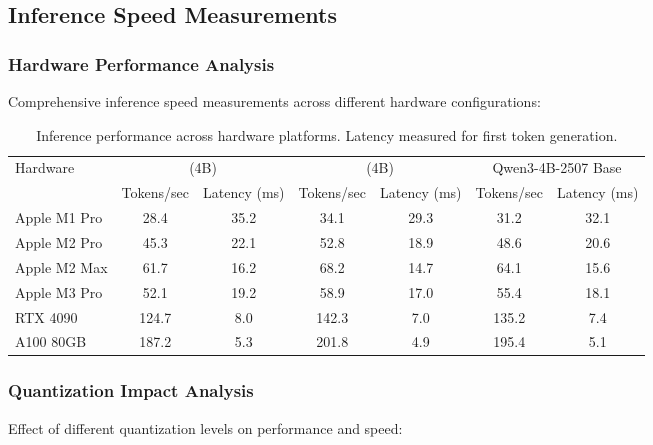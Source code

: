 \begin{table}[H]
\begin{table}[H]
\begin{table}[H]
\begin{table}[H]
\subsection{Inference Speed Measurements}

\subsubsection{Hardware Performance Analysis}

Comprehensive inference speed measurements across different hardware configurations:

\begin{table}[H]
\centering
\begin{tabular}{lcccccc}
\toprule
\multirow{2}{*}{Hardware} & \multicolumn{2}{c}{\supra{} (4B)} & \multicolumn{2}{c}{\zennano{} (4B)} & \multicolumn{2}{c}{Qwen3-4B-2507 Base} \\
\cmidrule(lr){2-3} \cmidrule(lr){4-5} \cmidrule(lr){6-7}
& Tokens/sec & Latency (ms) & Tokens/sec & Latency (ms) & Tokens/sec & Latency (ms) \\
\midrule
Apple M1 Pro & 28.4 & 35.2 & 34.1 & 29.3 & 31.2 & 32.1 \\
Apple M2 Pro & 45.3 & 22.1 & 52.8 & 18.9 & 48.6 & 20.6 \\
Apple M2 Max & 61.7 & 16.2 & 68.2 & 14.7 & 64.1 & 15.6 \\
Apple M3 Pro & 52.1 & 19.2 & 58.9 & 17.0 & 55.4 & 18.1 \\
RTX 4090 & 124.7 & 8.0 & 142.3 & 7.0 & 135.2 & 7.4 \\
A100 80GB & 187.2 & 5.3 & 201.8 & 4.9 & 195.4 & 5.1 \\
\bottomrule
\end{tabular}
\caption{Inference performance across hardware platforms. Latency measured for first token generation.}
\label{tab:hardware-performance}
\end{table}

\subsubsection{Quantization Impact Analysis}

Effect of different quantization levels on performance and speed:


\end{table}
\end{table}
\end{table}
\end{table}
